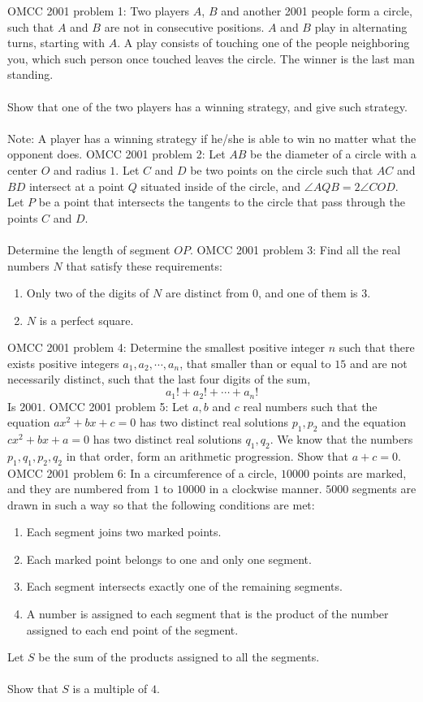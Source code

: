 OMCC 2001 problem 1:  Two players $ A$, $ B$ and another 2001 people form a circle, such that $ A$ and $ B$ are not in consecutive  positions. $ A$ and $ B$ play in alternating turns, starting with $ A$. A play consists of touching one of the people neighboring you, which such person once touched leaves the circle. The winner is the last man standing. \\\\
Show that one of the two players has a winning strategy, and give such strategy. \\\\
Note: A player has a winning strategy if he/she is able to win no matter what the opponent does. 
OMCC 2001 problem 2:  Let $ AB$ be the diameter of a circle with a center $ O$ and radius $ 1$. Let $ C$ and $ D$ be two points on the circle such that $ AC$ and $ BD$ intersect at a point $ Q$ situated inside of the circle, and $ \angle AQB= 2 \angle COD$. Let $ P$ be a point that intersects the tangents to the circle that pass through the points $ C$ and $ D$. \\\\
Determine the length of segment $ OP$. 
OMCC 2001 problem 3:  Find all the real numbers $ N$ that satisfy these requirements:
\begin{enumerate}
  \item Only two of the digits of $ N$ are distinct from $ 0$, and one of them is $ 3$.
  \item $ N$ is a perfect square.
\end{enumerate} 
OMCC 2001 problem 4:  Determine the smallest positive integer $ n$ such that there exists positive integers $ a_1,a_2,\cdots,a_n$, that smaller than or equal to $ 15$ and are not necessarily distinct, such that the last four digits of the sum,
\[ a_1!+a_2!+\cdots+a_n! \]
Is $ 2001$. 
OMCC 2001 problem 5:  Let $ a,b$ and $ c$ real numbers such that the equation $ ax^2+bx+c=0$ has two distinct real solutions $ p_1,p_2$ and the equation $ cx^2+bx+a=0$ has two distinct real solutions $ q_1,q_2$. We know that the numbers $ p_1,q_1,p_2,q_2$ in that order, form an arithmetic progression. Show that $ a+c=0$. 
OMCC 2001 problem 6:  In a circumference of a circle, $ 10000$ points are marked, and they are numbered from $ 1$ to $ 10000$ in a clockwise manner. $ 5000$ segments are drawn in such a way so that the following conditions are met:
\begin{enumerate}
  \item Each segment joins two marked points.
  \item Each marked point belongs to one and only one segment.
  \item Each segment intersects exactly one of the remaining segments.
  \item A number is assigned to each segment that is the product of the number assigned to each end point of the segment.
\end{enumerate}
Let $ S$ be the sum of the products assigned to all the segments. \\\\
Show that $ S$ is a multiple of $ 4$. 

